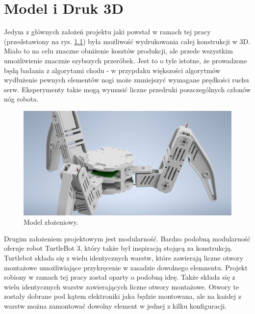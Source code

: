 \chapter{Model i Druk 3D}
Jedym z głównych założeń projektu jaki powstał w ramach tej pracy (przedstawiony na rys. \ref{CAD_assembly}) była możliwość wydrukowania całej konstrukcji w 3D. Miało to na celu znaczne obniżenie kosztów produkcji, ale przede wszystkim umożliwienie znacznie szybszych przeróbek. Jest to o tyle istotne, że prowadzone będą badania z algorytami chodu - w przypdaku większości algorytmów wydłużenie pewnych elementów nogi może zmniejszyć wymagane prędkości ruchu serw. Eksperymenty takie mogą wymusić liczne przedruki poszczególnych członów nóg robota.\\

\begin{figure}[h!]
\includegraphics[width=\textwidth]{img/CAD_assembly.png}
\caption{Model złożeniowy.}
\label{CAD_assembly}
\end{figure}

Drugim założeniem projektowym jest modularność. Bardzo podobną modularność oferuje robot TurtleBot 3, który także był inspiracją stojącą za konstrukcją. Turtlebot składa się z wielu identycznych warstw, które zawierają liczne otwory montażowe umożliwiające przykręcenie w zasadzie dowolnego elemnentu. Projekt robiony w ramach tej pracy został oparty o podobną ideę. Także składa się z wielu identycznych warstw zawierających liczne otwory montażowe. Otwory te zostały dobrane pod kątem elektroniki jaka będzie montowana, ale na każdej z warstw można zamontować dowolny element w jednej z kilku konfiguracji.\\

